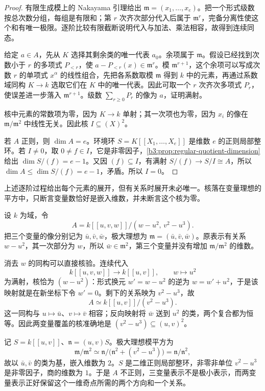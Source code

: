 \begin{proof}
	有限生成模上的 Nakayama 引理给出 \(\mathfrak m=(x_1,\ldots,x_e)\)。把一个形式级数按总次数分组，每组是有限和；第 \(r\) 次齐次部分代入后属于 \(\mathfrak m^r\)，完备分离性使这个和有唯一极限。逐阶比较有限截断说明代入与加法、乘法相容，故得到连续同态。

	给定 \(a\in A\)，先从 \(K\) 选择其剩余类的唯一代表 \(a_0\)。余项属于 \(\mathfrak m\)。假设已经找到次数小于 \(r\) 的多项式 \(P_{<r}\)，使 \(a-P_{<r}(x)\in\mathfrak m^r\)。模 \(\mathfrak m^{r+1}\)，这个余项可以写成次数 \(r\) 的单项式 \(x^\alpha\) 的线性组合，先把各系数取模 \(\mathfrak m\) 得到 \(k\) 中的元素，再通过系数域同构 \(K\to k\) 选取它们在 \(K\) 中的唯一代表。因此可取一个 \(r\) 次齐次多项式 \(P_r\)，使误差进一步落入 \(\mathfrak m^{r+1}\)。级数 \(\sum_{r\ge0}P_r\) 的像为 \(a\)，证明满射。

	核中元素的常数项为零，因为 \(K\to k\) 单射；其一次项也为零，因为 \(x_i\) 的像在 \(\mathfrak m/\mathfrak m^2\) 中线性无关。因此核 \(I\subseteq(X)^2\)。

	若 \(A\) 正则，则 \(\dim A=e\)。环境环 \(S=K[\![X_1,\ldots,X_e]\!]\) 是维数 \(e\) 的正则局部整环。若 \(I\ne0\)，取 \(0\ne f\in I\)，它是非零因子，\cref{b3:prop:regular-quotient-dimension}给出 \(\dim S/(f)=e-1\)。又因 \((f)\subseteq I\)，有满射 \(S/(f)\to S/I\cong A\)，所以 \(\dim A\le\dim S/(f)=e-1\)，矛盾。所以 \(I=0\)。
\end{proof}

上述逐阶过程给出每个元素的展开，但有关系时展开未必唯一。核落在变量理想的平方中，只断言变量数恰好是嵌入维数，并未断言这个核为零。

\begin{example}\label{b3:exm:cohen-cusp-presentation}\label{b3:exm:minimal-cohen-elimination}
	设 \(k\) 为域，令
	\[
		A=k[\![u,v,w]\!]/(w-u^2,\,v^2-u^3).
	\]
	把三个变量的像分别记为 \(\bar u,\bar v,\bar w\)，极大理想为 \(\mathfrak m=(\bar u,\bar v,\bar w)\)。原表示有关系 \(w-u^2\)，其一次部分为 \(w\)，所以 \(\bar w\in\mathfrak m^2\)，第三个变量并没有增加 \(\mathfrak m/\mathfrak m^2\) 的维数。

	\ProseParagraphBreak
	消去 \(w\) 的同构可以直接核验。连续代入
	\[
		k[\![u,v,w]\!]\longrightarrow k[\![u,v]\!], \qquad w\longmapsto u^2
	\]
	为满射，核恰为 \((w-u^2)\)：形式换元 \(w'=w-u^2\) 的逆为 \(w=w'+u^2\)，于是该映射就是在新坐标下令 \(w'=0\)。剩下的关系映为 \(v^2-u^3\)，故
	\[
		A\simeq k[\![u,v]\!]/(v^2-u^3).
	\]
	这一同构与 \(u\mapsto\bar u\)、\(v\mapsto\bar v\) 相容；反向映射将 \(\bar w\) 送到 \(u^2\) 的类，两个复合都为恒等。因此两变量覆盖的核准确地是 \((v^2-u^3)\subseteq(u,v)^2\)。

	\ProseParagraphBreak
	记 \(S=k[\![u,v]\!]\)、\(\mathfrak n=(u,v)S\)。极大理想模平方为
	\[
		\mathfrak m/\mathfrak m^2 \simeq\mathfrak n/\bigl(\mathfrak n^2+(v^2-u^3)\bigr) =\mathfrak n/\mathfrak n^2,
	\]
	故以 \(\bar u,\bar v\) 的类为基，嵌入维数为 \(2\)。\(S\) 是二维正则局部整环，非零非单位 \(v^2-u^3\) 是非零因子，商的维数为 \(1\)。于是 \(A\) 不正则，三变量表示不是极小表示，而两变量表示正好保留这个一维奇点所需的两个方向和一个关系。
\end{example}

